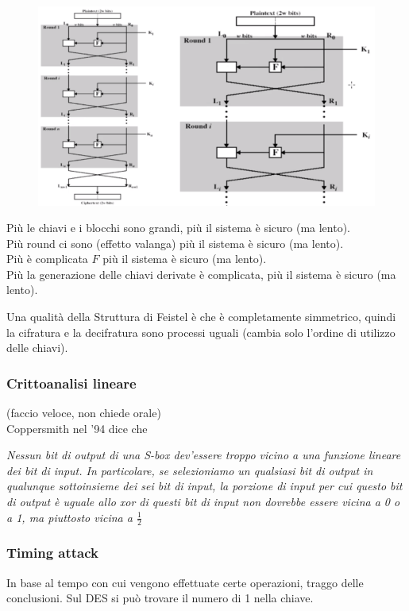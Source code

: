 \begin{figure}[h]
	\centering
	\includegraphics[width=\linewidth]{immagini/img45}
\end{figure}

Più le chiavi e i blocchi sono grandi, più il sistema è sicuro (ma lento).\\
Più round ci sono (effetto valanga) più il sistema è sicuro (ma lento).\\
Più è complicata $F$ più il sistema è sicuro (ma lento).\\
Più la generazione delle chiavi derivate è complicata, più il sistema è sicuro (ma lento).

Una qualità della Struttura di Feistel è che è completamente simmetrico, quindi la cifratura e la decifratura sono processi uguali (cambia solo l'ordine di utilizzo delle chiavi).


\subsubsection*{Crittoanalisi lineare} 
(faccio veloce, non chiede orale)\\
Coppersmith nel '94 dice che 
\begin{center}
	\textit{Nessun bit di output di una S-box dev'essere troppo vicino a una funzione lineare dei bit di input. In particolare, se selezioniamo un qualsiasi bit di output in qualunque sottoinsieme dei sei bit di input, la porzione di input per cui questo bit di output è uguale allo xor di questi bit di input non dovrebbe essere vicina a 0 o a 1, ma piuttosto vicina a $\frac12$}
\end{center}

\subsubsection*{Timing attack}
In base al tempo con cui vengono effettuate certe operazioni, traggo delle conclusioni. Sul DES si può trovare il numero di 1 nella chiave.

